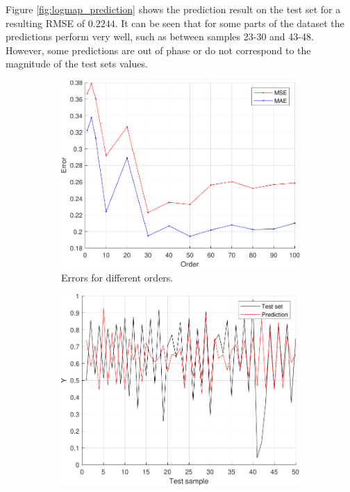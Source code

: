 \documentclass{article}
\begin{document}
        Figure \ref{fig:logmap_prediction} shows the prediction result on the test set for a resulting RMSE of $0.2244$. It can be seen that for some parts of the dataset the predictions perform very well, such as between samples 23-30 and 43-48. However, some predictions are out of phase or do not correspond to the magnitude of the test sets values.
        \begin{figure}[h]
             \centering
             \hspace{0.05\textwidth}
             \begin{subfigure}[b]{0.4\textwidth}
                 \centering
                 \includegraphics[width=\textwidth]{Assignment 2/figures/2_2/MSEvsMAE_ordersweep.pdf}
                 \caption{Errors for different orders.}
                 \label{fig:order_sweep}
             \end{subfigure}
             \hfill
             \begin{subfigure}[b]{0.4\textwidth}
                 \centering
                 \includegraphics[width=\textwidth]{Assignment 2/figures/2_2/prediction.pdf}

\end{subfigure}
\end{figure}
\end{document}

